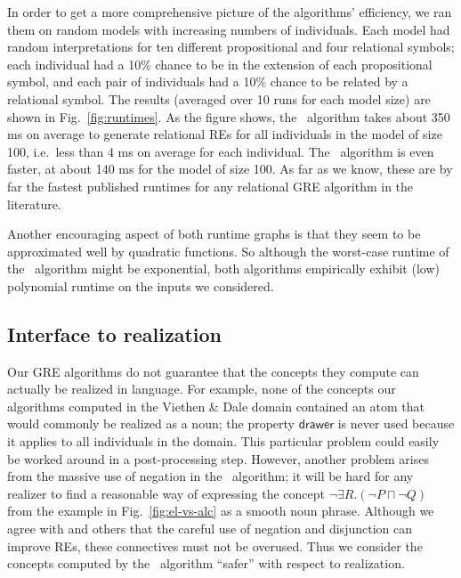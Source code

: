 In order to get a more comprehensive picture of the algorithms'
efficiency, we ran them on random models with increasing numbers of
individuals.  Each model had random interpretations for ten different
propositional and four relational symbols; each individual had a 10\%
chance to be in the extension of each propositional symbol, and each
pair of individuals had a 10\% chance to be related by a relational
symbol.  The results (averaged over 10 runs for each model size) are
shown in Fig.~\ref{fig:runtimes}.  As the figure shows, the \el\
algorithm takes about 350 ms on average to generate relational REs for
all individuals in the model of size 100, i.e.\ less than 4 ms on
average for each individual.  The \alc\ algorithm is even faster, at
about 140 ms for the model of size 100.  As far as we know, these are
by far the fastest published runtimes for any relational GRE algorithm
in the literature.

Another encouraging aspect of both runtime graphs is that they seem to
be approximated well by quadratic functions.  So although the
worst-case runtime of the \el\ algorithm might be exponential, both
algorithms empirically exhibit (low) polynomial runtime on the inputs
we considered.



\subsection{Interface to realization}


Our GRE algorithms do not guarantee that the concepts they compute can
actually be realized in language.  For example, none of the concepts
our algorithms computed in the Viethen \& Dale domain contained an
atom that would commonly be realized as a noun; the property
$\mathsf{drawer}$ is never used because it applies to all individuals
in the domain.  This particular problem could easily be worked around
in a post-processing step.  However, another problem arises from the
massive use of negation in the \alc\ algorithm; it will be hard for
any realizer to find a reasonable way of expressing the concept $\neg
\exists R.(\neg P \sqcap \neg Q)$ from the example in
Fig.~\ref{fig:el-vs-alc} as a smooth noun phrase.  Although we agree
with \newcite{deemter01:_gener_refer_expres} and others that the
careful use of negation and disjunction can improve REs, these
connectives must not be overused.  Thus we consider the concepts
computed by the \el\ algorithm ``safer'' with respect to realization.

